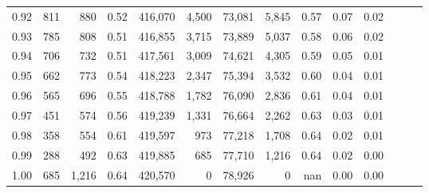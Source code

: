 \begin{tabular}{rrrrrrrrrrrrrr}
0.92 &    811 &    880 &  0.52 &  416,070 &    4,500 &  73,081 &   5,845 &  0.57 &  0.07 &      0.02 \\
0.93 &    785 &    808 &  0.51 &  416,855 &    3,715 &  73,889 &   5,037 &  0.58 &  0.06 &      0.02 \\
0.94 &    706 &    732 &  0.51 &  417,561 &    3,009 &  74,621 &   4,305 &  0.59 &  0.05 &      0.01 \\
0.95 &    662 &    773 &  0.54 &  418,223 &    2,347 &  75,394 &   3,532 &  0.60 &  0.04 &      0.01 \\
0.96 &    565 &    696 &  0.55 &  418,788 &    1,782 &  76,090 &   2,836 &  0.61 &  0.04 &      0.01 \\
0.97 &    451 &    574 &  0.56 &  419,239 &    1,331 &  76,664 &   2,262 &  0.63 &  0.03 &      0.01 \\
0.98 &    358 &    554 &  0.61 &  419,597 &      973 &  77,218 &   1,708 &  0.64 &  0.02 &      0.01 \\
0.99 &    288 &    492 &  0.63 &  419,885 &      685 &  77,710 &   1,216 &  0.64 &  0.02 &      0.00 \\
1.00 &    685 &  1,216 &  0.64 &  420,570 &        0 &  78,926 &       0 &   nan &  0.00 &      0.00 \\
\bottomrule
\end{tabular}
